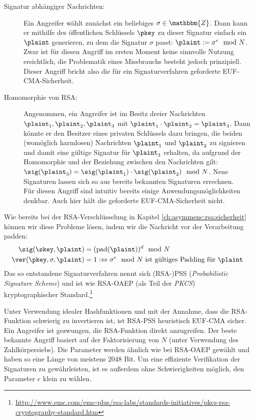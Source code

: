 \begin{description}
    \item[Signatur abhängiger Nachrichten:] Ein Angreifer wählt zunächst ein beliebiges $\sigma \in \mathbbm{Z}$. Dann kann er mithilfe des öffentlichen Schlüssels $\pkey$ zu dieser Signatur einfach ein $\plaint$ generieren, zu dem die Signatur $\sigma$ passt: $\plaint := \sigma^e \mod N$.\\
    Zwar ist für diesen Angriff im ersten Moment keine sinnvolle Nutzung ersichtlich, die Problematik eines Missbrauchs besteht jedoch prinzipiell. Dieser Angriff bricht also die für ein Signaturverfahren geforderte EUF-CMA-Sicherheit.
    \item[Homomorphie von RSA:] Angenommen, ein Angreifer ist im Besitz dreier Nachrichten $\plaint_1,\plaint_2,\plaint_3$ mit $\plaint_1 \cdot \plaint_2 = \plaint_3$. Dann könnte er den Besitzer eines privaten Schlüssels dazu bringen, die beiden (womöglich harmlosen) Nachrichten $\plaint_1$ und $\plaint_2$ zu signieren und damit eine gültige Signatur für $\plaint_3$ erhalten, da aufgrund der Homomorphie und der Beziehung zwischen den Nachrichten gilt:
    $\sig(\plaint_3) = \sig(\plaint_1) \cdot \sig(\plaint_2) \mod N$. Neue Signaturen lassen sich so aus bereits bekannten Signaturen errechnen.\\
    Für diesen Angriff sind intuitiv bereits einige Anwendungsmöglichkeiten denkbar. Auch hier hält die geforderte EUF-CMA-Sicherheit nicht.
\end{description}
Wie bereits bei der RSA-Verschlüsselung in Kapitel \ref{ch:asymmenc:rsa:sicherheit} können wir diese Probleme lösen, indem wir die Nachricht vor der Verarbeitung padden:
\begin{align*}
\sig(\skey,\plaint) &= (\text{pad}(\plaint))^d \mod N\\
\ver(\pkey,\sigma,\plaint) &= 1 :\Leftrightarrow \sigma^e \mod N \text{ ist gültiges Padding für } \plaint
\end{align*}
Das so entstandene Signaturverfahren nennt sich (RSA-)PSS (\emph{Probabilistic Signature Scheme}) und ist wie RSA-OAEP (als Teil der \emph{PKCS}) kryptographischer Standard.\footnote{\url{http://www.emc.com/emc-plus/rsa-labs/standards-initiatives/pkcs-rsa-cryptography-standard.htm}}

Unter Verwendung idealer Hashfunktionen und mit der Annahme, dass die RSA-Funktion schwierig zu invertieren ist, ist RSA-PSS heuristisch EUF-CMA sicher. Ein Angreifer ist gezwungen, die RSA-Funktion direkt anzugreifen. Der beste bekannte Angriff basiert auf der Faktorisierung von $N$ (unter Verwendung des Zahlkörpersiebs). Die Parameter werden ähnlich wie bei RSA-OAEP gewählt und haben so eine Länge von meistens 2048 Bit. Um eine effiziente Verifikation der Signaturen zu gewährleisten, ist es außerdem ohne Schwierigkeiten möglich, den Parameter $e$ klein zu wählen.


